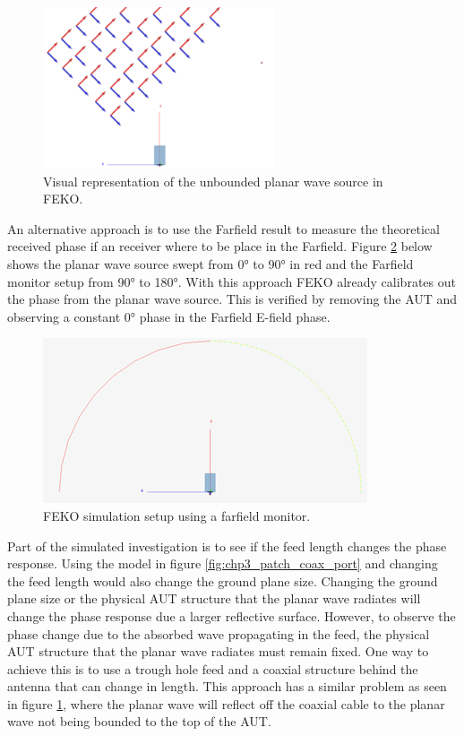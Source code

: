     \begin{figure}[H]
    \centering
    \includegraphics[width=0.4\linewidth]{Figures/chp3_planar_source_unbounded.png}
    \caption{Visual representation of the unbounded planar wave source in FEKO.}
    \label{fig:chp3_planar_source_unbounded}
    \end{figure}

An alternative approach is to use the Farfield result to measure the theoretical received phase if an receiver where to be place in the Farfield. Figure \ref{fig:chp3_simulation_farfield_setup} below shows the planar wave source swept from 0° to 90° in red and the Farfield monitor setup from 90° to 180°. With this approach FEKO already calibrates out the phase from the planar wave source. This is verified by removing the AUT and observing a constant 0° phase in the Farfield E-field phase.

    \begin{figure}[H]
    \centering
    \includegraphics[width=0.65\linewidth]{Figures/chp3_simulation_farfield_setup.png}
    \caption{FEKO simulation setup using a farfield monitor.}
    \label{fig:chp3_simulation_farfield_setup}
    \end{figure}

Part of the simulated investigation is to see if the feed length changes the phase response. Using the model in figure \ref{fig:chp3_patch_coax_port} and changing the feed length would also change the ground plane size. Changing the ground plane size or the physical AUT structure that the planar wave radiates will change the phase response due a larger reflective surface. However, to observe the phase change due to the absorbed wave propagating in the feed, the physical AUT structure that the planar wave radiates must remain fixed. One way to achieve this is to use a trough hole feed and a coaxial structure behind the antenna that can change in length. This approach has a similar problem as seen in figure \ref{fig:chp3_planar_source_unbounded}, where the planar wave will reflect off the coaxial cable to the planar wave not being bounded to the top of the AUT.


